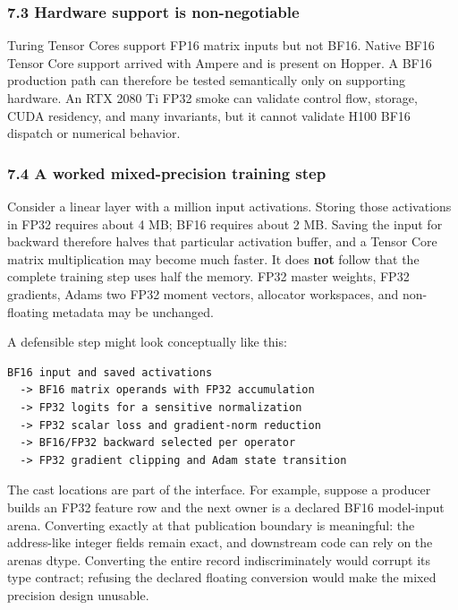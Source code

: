 \documentclass[
  10pt,
  letterpaper,
]{article}
\begin{document}
\subsubsection{7.3 Hardware support is
non-negotiable}\label{73-hardware-support-is-non-negotiable}

Turing Tensor Cores support FP16 matrix inputs but not BF16. Native BF16
Tensor Core support arrived with Ampere and is present on Hopper. A BF16
production path can therefore be tested semantically only on supporting
hardware. An RTX 2080 Ti FP32 smoke can validate control flow, storage,
CUDA residency, and many invariants, but it cannot validate H100 BF16
dispatch or numerical behavior.

\subsubsection{7.4 A worked mixed-precision training
step}\label{74-a-worked-mixed-precision-training-step}

Consider a linear layer with a million input activations. Storing those
activations in FP32 requires about 4 MB; BF16 requires about 2 MB.
Saving the input for backward therefore halves that particular
activation buffer, and a Tensor Core matrix multiplication may become
much faster. It does \textbf{not} follow that the complete training step
uses half the memory. FP32 master weights, FP32 gradients,
Adam\textquotesingle s two FP32 moment vectors, allocator workspaces,
and non-floating metadata may be unchanged.

A defensible step might look conceptually like this:

\begin{verbatim}
BF16 input and saved activations
  -> BF16 matrix operands with FP32 accumulation
  -> FP32 logits for a sensitive normalization
  -> FP32 scalar loss and gradient-norm reduction
  -> BF16/FP32 backward selected per operator
  -> FP32 gradient clipping and Adam state transition
\end{verbatim}

The cast locations are part of the interface. For example, suppose a
producer builds an FP32 feature row and the next owner is a declared
BF16 model-input arena. Converting exactly at that publication boundary
is meaningful: the address-like integer fields remain exact, and
downstream code can rely on the arena\textquotesingle s dtype.
Converting the entire record indiscriminately would corrupt its type
contract; refusing the declared floating conversion would make the mixed
precision design unusable.
\end{document}
